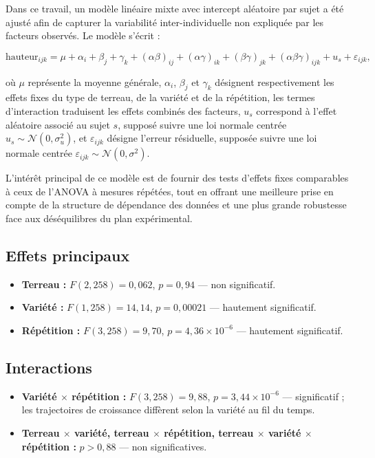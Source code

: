 \documentclass[12pt, a4paper]{report}
\begin{document}
Dans ce travail, un modèle linéaire mixte avec intercept aléatoire par sujet a été ajusté afin
de capturer la variabilité inter-individuelle non expliquée par les facteurs observés. Le
modèle s’écrit :

\[
  \text{hauteur}_{ijk} = \mu + \alpha_i + \beta_j + \gamma_k + (\alpha\beta)_{ij} +
  (\alpha\gamma)_{ik} + (\beta\gamma)_{jk} + (\alpha\beta\gamma)_{ijk} + u_s + \varepsilon_{ijk},
\]

où $\mu$ représente la moyenne générale, $\alpha_i$, $\beta_j$ et $\gamma_k$ désignent
respectivement les effets fixes du type de terreau, de la variété et de la répétition, les
termes d’interaction traduisent les effets combinés des facteurs, $u_s$ correspond à l’effet
aléatoire associé au sujet $s$, supposé suivre une loi normale centrée
$u_s \sim \mathcal{N}(0, \sigma_u^2)$, et $\varepsilon_{ijk}$ désigne l’erreur résiduelle,
supposée suivre une loi normale centrée $\varepsilon_{ijk} \sim \mathcal{N}(0, \sigma^2)$.

L’intérêt principal de ce modèle est de fournir des tests d’effets fixes comparables à ceux de
l’ANOVA à mesures répétées, tout en offrant une meilleure prise en compte de la structure de
dépendance des données et une plus grande robustesse face aux déséquilibres du plan
expérimental.

\subsection*{Effets principaux}
\begin{itemize}[leftmargin=*, label=\textbullet]
  \item \textbf{Terreau :} $F(2, 258) = 0{,}062$, $p = 0{,}94$ — non significatif.
  \item \textbf{Variété :} $F(1, 258) = 14{,}14$, $p = 0{,}00021$ — hautement significatif.
  \item \textbf{Répétition :} $F(3, 258) = 9{,}70$, $p = 4{,}36 \times 10^{-6}$ — hautement
        significatif.
\end{itemize}

\subsection*{Interactions}
\begin{itemize}[leftmargin=*, label=\textbullet]
  \item \textbf{Variété $\times$ répétition :} $F(3, 258) = 9{,}88$, $p = 3{,}44 \times
        10^{-6}$ — significatif ; les trajectoires de croissance diffèrent selon la variété
        au fil du temps.
  \item \textbf{Terreau $\times$ variété, terreau $\times$ répétition, terreau $\times$
        variété $\times$ répétition :} $p > 0{,}88$ — non significatives.
\end{itemize}
\end{document}
